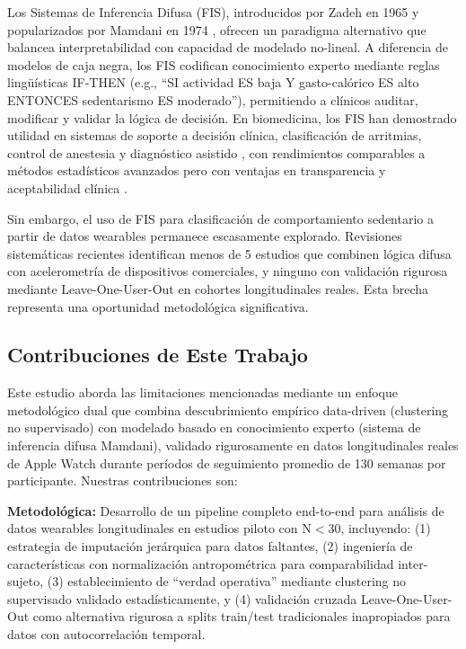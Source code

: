 \documentclass[journal,twoside,web]{ieeecolor}
\begin{document}
Los Sistemas de Inferencia Difusa (FIS), introducidos por Zadeh en 1965 \cite{Zadeh1965} y popularizados por Mamdani en 1974 \cite{Mamdani1974}, ofrecen un paradigma alternativo que balancea interpretabilidad con capacidad de modelado no-lineal. A diferencia de modelos de caja negra, los FIS codifican conocimiento experto mediante reglas lingüísticas IF-THEN (e.g., ``SI actividad ES baja Y gasto-calórico ES alto ENTONCES sedentarismo ES moderado''), permitiendo a clínicos auditar, modificar y validar la lógica de decisión. En biomedicina, los FIS han demostrado utilidad en sistemas de soporte a decisión clínica, clasificación de arritmias, control de anestesia y diagnóstico asistido \cite{Kaur2022}, con rendimientos comparables a métodos estadísticos avanzados pero con ventajas en transparencia y aceptabilidad clínica \cite{Seoni2023}.

Sin embargo, el uso de FIS para clasificación de comportamiento sedentario a partir de datos wearables permanece escasamente explorado. Revisiones sistemáticas recientes identifican menos de 5 estudios que combinen lógica difusa con acelerometría de dispositivos comerciales, y ninguno con validación rigurosa mediante Leave-One-User-Out en cohortes longitudinales reales. Esta brecha representa una oportunidad metodológica significativa.

\subsection{Contribuciones de Este Trabajo}

Este estudio aborda las limitaciones mencionadas mediante un enfoque metodológico dual que combina descubrimiento empírico data-driven (clustering no supervisado) con modelado basado en conocimiento experto (sistema de inferencia difusa Mamdani), validado rigurosamente en datos longitudinales reales de Apple Watch durante períodos de seguimiento promedio de 130 semanas por participante. Nuestras contribuciones son:

\textbf{Metodológica:} Desarrollo de un pipeline completo end-to-end para análisis de datos wearables longitudinales en estudios piloto con N$<$30, incluyendo: (1) estrategia de imputación jerárquica para datos faltantes, (2) ingeniería de características con normalización antropométrica para comparabilidad inter-sujeto, (3) establecimiento de ``verdad operativa'' mediante clustering no supervisado validado estadísticamente, y (4) validación cruzada Leave-One-User-Out como alternativa rigurosa a splits train/test tradicionales inapropiados para datos con autocorrelación temporal.
\end{document}
